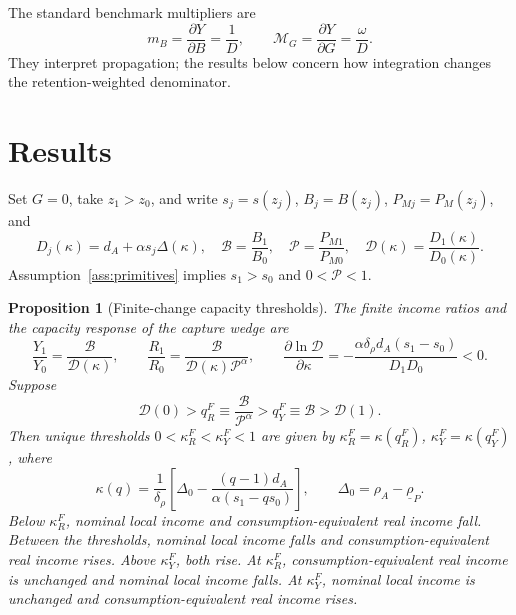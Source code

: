 \documentclass[11pt]{article}
\theoremstyle{plain}
\newtheorem{proposition}{Proposition}
\theoremstyle{definition}
\begin{document}
The standard benchmark multipliers are
\begin{equation}
 m_B=\frac{\partial Y}{\partial B}=\frac1D,
 \qquad
 \mathcal M_G=\frac{\partial Y}{\partial G}=\frac{\omega}{D}.
 \label{eq:benchmark-multipliers}
\end{equation}
They interpret propagation; the results below concern how integration changes
the retention-weighted denominator.

\section{Results}
\label{sec:results}

Set \(G=0\), take \(z_1>z_0\), and write \(s_j=s(z_j)\),
\(B_j=B(z_j)\), \(P_{Mj}=P_M(z_j)\), and
\begin{equation}
 D_j(\kappa)=d_A+\alpha s_j\Delta(\kappa),\quad
 \mathcal B=\frac{B_1}{B_0},\quad
 \mathcal P=\frac{P_{M1}}{P_{M0}},\quad
 \mathcal D(\kappa)=\frac{D_1(\kappa)}{D_0(\kappa)}.
 \label{eq:finite-definitions}
\end{equation}
Assumption~\ref{ass:primitives} implies \(s_1>s_0\) and
\(0<\mathcal P<1\).

\begin{proposition}[Finite-change capacity thresholds]
\label{prop:finite-capacity}
The finite income ratios and the capacity response of the capture wedge are
\begin{equation}
 \frac{Y_1}{Y_0}=\frac{\mathcal B}{\mathcal D(\kappa)},
 \qquad
 \frac{R_1}{R_0}=\frac{\mathcal B}
 {\mathcal D(\kappa)\mathcal P^\alpha},
 \qquad
 \frac{\partial\ln\mathcal D}{\partial\kappa}
 =-\frac{\alpha\delta_\rho d_A(s_1-s_0)}{D_1D_0}<0.
 \label{eq:finite-ratios}
\end{equation}
Suppose
\begin{equation}
 \mathcal D(0)>
 q_R^F\equiv\frac{\mathcal B}{\mathcal P^\alpha}
 >q_Y^F\equiv\mathcal B>\mathcal D(1).
 \label{eq:finite-capacity-crossing}
\end{equation}
Then unique thresholds \(0<\kappa_R^F<\kappa_Y^F<1\) are given by
\(\kappa_R^F=\kappa(q_R^F)\), \(\kappa_Y^F=\kappa(q_Y^F)\), where
\begin{equation}
 \kappa(q)=\frac1{\delta_\rho}
 \left[\Delta_0-
 \frac{(q-1)d_A}{\alpha(s_1-qs_0)}\right],
 \qquad \Delta_0=\rho_A-\underline\rho_P.
 \label{eq:finite-capacity-solution}
\end{equation}
Below \(\kappa_R^F\), nominal local income and consumption-equivalent real income
fall. Between the thresholds, nominal local income falls and
consumption-equivalent real income rises. Above \(\kappa_Y^F\), both rise. At
\(\kappa_R^F\), consumption-equivalent real income is unchanged and nominal
local income falls. At \(\kappa_Y^F\), nominal local income is unchanged and
consumption-equivalent real income rises.
\end{proposition}
\end{document}
